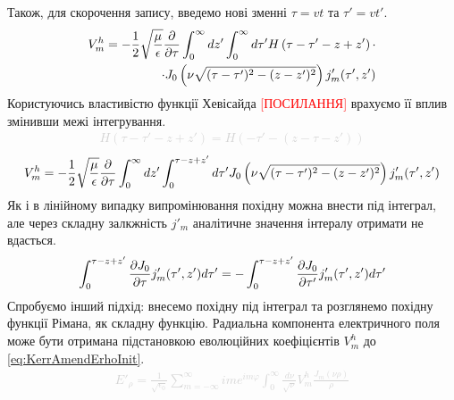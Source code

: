 %
Також, для скорочення запису, введемо нові зменні $ \tau = vt $ та 
$ \tau' = vt' $.
%
\begin{equation*} \begin{aligned} 
V_m^h = - \frac{1}{2} \sqrt{\frac{\mu}{\epsilon}} \frac{\partial }{\partial \tau} 
\int_0^\infty dz' \int_0^\infty d \tau'
H \left( \tau - \tau' - z + z' \right) \cdot \\
\cdot J_0 \left( \nu \sqrt{(\tau-\tau')^2 - (z-z')^2} \right) j'_m (\tau',z')
\end{aligned} \end{equation*}
%
Користуючись властивістю функції Хевісайда \textcolor{red} {[ПОСИЛАННЯ]} 
врахуємо її вплив змінивши межі інтегрування.
%
\textcolor{lightgray} { \begin{equation*} \begin{aligned} 
H \left( \tau - \tau' - z + z' \right) = 
H \left( - \tau' - ( z  - \tau - z' ) \right)
\end{aligned} \end{equation*} }
%
\begin{equation*} \begin{aligned} 
V_m^h = - \frac{1}{2} \sqrt{\frac{\mu}{\epsilon}} \frac{\partial }{\partial \tau} 
\int_0^\infty dz' \int_0^{\tau - z + z'} d \tau'
J_0 \left( \nu \sqrt{(\tau-\tau')^2 - (z-z')^2} \right) j'_m (\tau',z')
\end{aligned} \end{equation*}
%
Як і в лінійному випадку випромінювання похідну можна внести під інтеграл, але 
через складну залкжність $ j'_m $ аналітичне значення інтералу отримати не вдасться.
%
\begin{equation*} \begin{aligned} 
\int_0^{\tau - z + z'} \frac{\partial J_0}{\partial \tau} j'_m (\tau',z') d \tau' =
- \int_0^{\tau - z + z'} \frac{\partial J_0}{\partial \tau'} j'_m (\tau',z') d \tau'
\end{aligned} \end{equation*}
%
Спробуємо інший підхід: внесемо похідну під інтеграл та розглянемо похідну функції
Рімана, як складну функцію.
%
Радиальна компонента електричного поля може бути отримана підстановкою 
еволюційних коефіцієнтів $ V_m^h $ до \eqref{eq:KerrAmendErhoInit}.
%
\textcolor{lightgray} {  \begin{equation*} \begin{aligned} 
E'_\rho = \frac{1}{\sqrt{\epsilon_0}} \sum_{m=-\infty}^{\infty} 
i m e^{im\varphi} \int_{0}^{\infty} \frac{d \nu}{\sqrt{\nu}} 
V_m^h \frac{J_m(\nu \rho)}{\rho}
\end{aligned} \end{equation*} }
